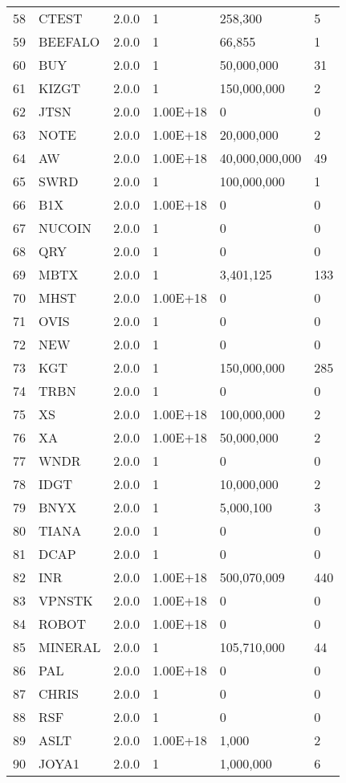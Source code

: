 \begin{longtable}{llllll}
58 & CTEST & 2.0.0 & 1 & 258,300 & 5 \\
59 & BEEFALO & 2.0.0 & 1 & 66,855 & 1 \\
60 & BUY & 2.0.0 & 1 & 50,000,000 & 31 \\
61 & KIZGT & 2.0.0 & 1 & 150,000,000 & 2 \\
62 & JTSN & 2.0.0 & 1.00E+18 & 0 & 0 \\
63 & NOTE & 2.0.0 & 1.00E+18 & 20,000,000 & 2 \\
64 & AW & 2.0.0 & 1.00E+18 & 40,000,000,000 & 49 \\
65 & SWRD & 2.0.0 & 1 & 100,000,000 & 1 \\
66 & B1X & 2.0.0 & 1.00E+18 & 0 & 0 \\
67 & NUCOIN & 2.0.0 & 1 & 0 & 0 \\
68 & QRY & 2.0.0 & 1 & 0 & 0 \\
69 & MBTX & 2.0.0 & 1 & 3,401,125 & 133 \\
70 & MHST & 2.0.0 & 1.00E+18 & 0 & 0 \\
71 & OVIS & 2.0.0 & 1 & 0 & 0 \\
72 & NEW & 2.0.0 & 1 & 0 & 0 \\
73 & KGT & 2.0.0 & 1 & 150,000,000 & 285 \\
74 & TRBN & 2.0.0 & 1 & 0 & 0 \\
75 & XS & 2.0.0 & 1.00E+18 & 100,000,000 & 2 \\
76 & XA & 2.0.0 & 1.00E+18 & 50,000,000 & 2 \\
77 & WNDR & 2.0.0 & 1 & 0 & 0 \\
78 & IDGT & 2.0.0 & 1 & 10,000,000 & 2 \\
79 & BNYX & 2.0.0 & 1 & 5,000,100 & 3 \\
80 & TIANA & 2.0.0 & 1 & 0 & 0 \\
81 & DCAP & 2.0.0 & 1 & 0 & 0 \\
82 & INR & 2.0.0 & 1.00E+18 & 500,070,009 & 440 \\
83 & VPNSTK & 2.0.0 & 1.00E+18 & 0 & 0 \\
84 & ROBOT & 2.0.0 & 1.00E+18 & 0 & 0 \\
85 & MINERAL & 2.0.0 & 1 & 105,710,000 & 44 \\
86 & PAL & 2.0.0 & 1.00E+18 & 0 & 0 \\
87 & CHRIS & 2.0.0 & 1 & 0 & 0 \\
88 & RSF & 2.0.0 & 1 & 0 & 0 \\
89 & ASLT & 2.0.0 & 1.00E+18 & 1,000 & 2 \\
90 & JOYA1 & 2.0.0 & 1 & 1,000,000 & 6 \\

\end{longtable}
